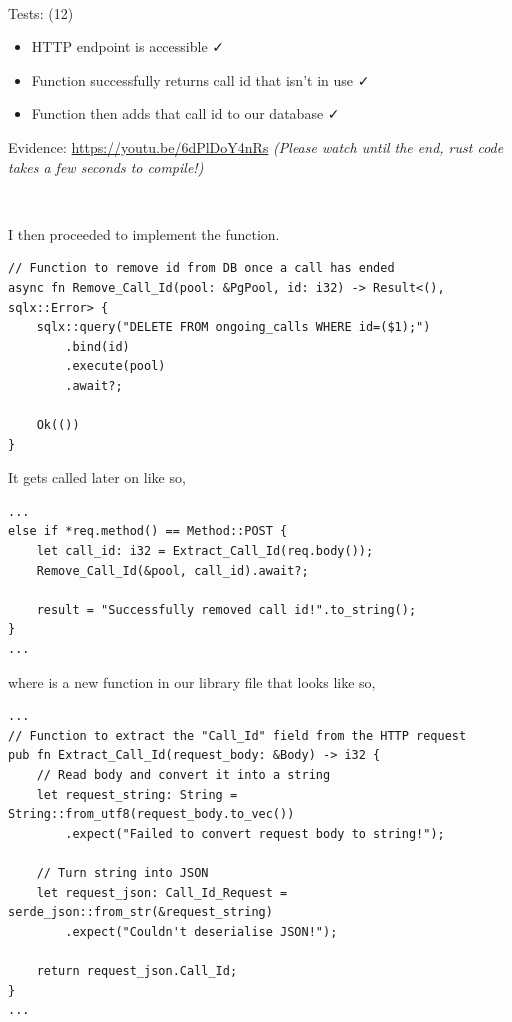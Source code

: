 {\color{gray} \hrulefill} \\ \vspace{0.2cm}

{\sffamily Tests: (12)}

\begin{itemize}
\item HTTP endpoint is accessible \faCheck \\
\item Function successfully returns call id that isn't in use \faCheck \\
\item Function then adds that call id to our database \faCheck \\
\end{itemize}

{\sffamily Evidence:} \url{https://youtu.be/6dPlDoY4nRs}
\textit{(Please watch until the end, rust code takes a
few seconds to compile!)}

{\color{gray} \hrulefill} \\ \vspace{0.2cm}

I then proceeded to implement the 
function.

\begin{verbatim}
// Function to remove id from DB once a call has ended
async fn Remove_Call_Id(pool: &PgPool, id: i32) -> Result<(), sqlx::Error> {
    sqlx::query("DELETE FROM ongoing_calls WHERE id=($1);")
        .bind(id)
        .execute(pool)
        .await?;

    Ok(())
}
\end{verbatim}

It gets called later on like so,

\begin{verbatim}
...
else if *req.method() == Method::POST {
    let call_id: i32 = Extract_Call_Id(req.body());
    Remove_Call_Id(&pool, call_id).await?;

    result = "Successfully removed call id!".to_string();
}
...
\end{verbatim}

where  is a new function in our
library file that looks like so,

\begin{verbatim}
...
// Function to extract the "Call_Id" field from the HTTP request
pub fn Extract_Call_Id(request_body: &Body) -> i32 {
    // Read body and convert it into a string
    let request_string: String = String::from_utf8(request_body.to_vec())
        .expect("Failed to convert request body to string!");

    // Turn string into JSON
    let request_json: Call_Id_Request = serde_json::from_str(&request_string)
        .expect("Couldn't deserialise JSON!");

    return request_json.Call_Id;
}
...
\end{verbatim}

